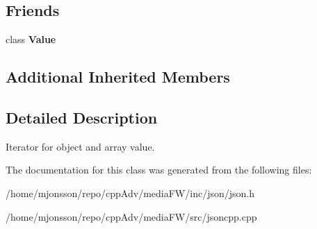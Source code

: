 \subsection*{Friends}
\begin{DoxyCompactItemize}
\item 
\mbox{\label{classJson_1_1ValueIterator_aeceedf6e1a7d48a588516ce2b1983d6f}} 
class {\bfseries Value}
\end{DoxyCompactItemize}
\subsection*{Additional Inherited Members}


\subsection{Detailed Description}
Iterator for object and array value. 

The documentation for this class was generated from the following files\+:\begin{DoxyCompactItemize}
\item 
/home/mjonsson/repo/cpp\+Adv/media\+F\+W/inc/json/json.\+h\item 
/home/mjonsson/repo/cpp\+Adv/media\+F\+W/src/jsoncpp.\+cpp\end{DoxyCompactItemize}
